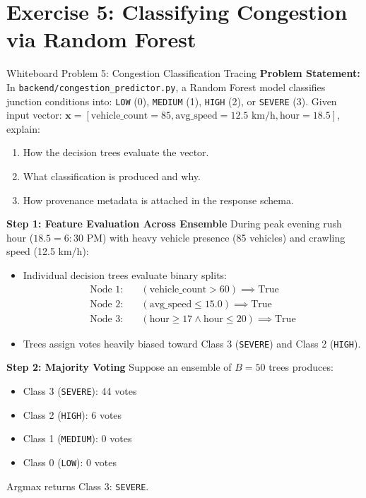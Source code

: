 \documentclass[11pt,a4paper,oneside]{report}
\begin{document}
\section{Exercise 5: Classifying Congestion via Random Forest}
\label{sec:wb_congestion}

\begin{interviewq}{Whiteboard Problem 5: Congestion Classification Tracing}
\textbf{Problem Statement:}
In \texttt{backend/congestion\_predictor.py}, a Random Forest model classifies junction conditions into:
\texttt{LOW} (0), \texttt{MEDIUM} (1), \texttt{HIGH} (2), or \texttt{SEVERE} (3).
Given input vector: $\mathbf{x} = [\text{vehicle\_count} = 85, \text{avg\_speed} = 12.5 \text{ km/h}, \text{hour} = 18.5]$, explain:
\begin{enumerate}
    \item How the decision trees evaluate the vector.
    \item What classification is produced and why.
    \item How provenance metadata is attached in the response schema.
\end{enumerate}
\tcblower
\textbf{Step 1: Feature Evaluation Across Ensemble}
During peak evening rush hour ($18.5 = 6:30$ PM) with heavy vehicle presence (85 vehicles) and crawling speed (12.5 km/h):
\begin{itemize}
    \item Individual decision trees evaluate binary splits:
    \begin{align*}
    \text{Node 1:} &\quad (\text{vehicle\_count} > 60) \implies \text{True} \\
    \text{Node 2:} &\quad (\text{avg\_speed} \le 15.0) \implies \text{True} \\
    \text{Node 3:} &\quad (\text{hour} \ge 17 \land \text{hour} \le 20) \implies \text{True}
    \end{align*}
    \item Trees assign votes heavily biased toward Class 3 (\texttt{SEVERE}) and Class 2 (\texttt{HIGH}).
\end{itemize}

\textbf{Step 2: Majority Voting}
Suppose an ensemble of $B = 50$ trees produces:
\begin{itemize}
    \item Class 3 (\texttt{SEVERE}): 44 votes
    \item Class 2 (\texttt{HIGH}): 6 votes
    \item Class 1 (\texttt{MEDIUM}): 0 votes
    \item Class 0 (\texttt{LOW}): 0 votes
\end{itemize}
Argmax returns Class 3: \texttt{SEVERE}.


\end{interviewq}
\end{document}
